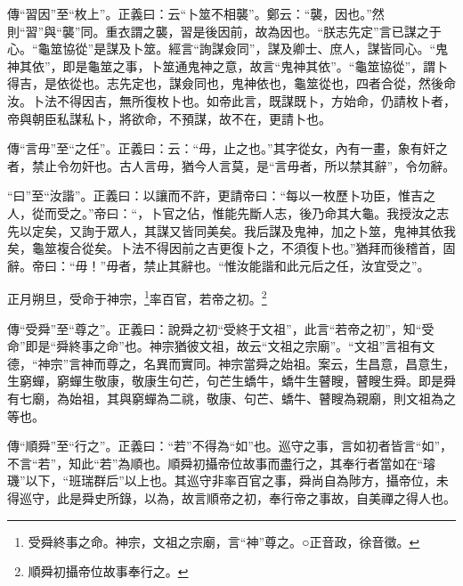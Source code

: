 {\noindent\zhuan{}\fzbyks 傳“習因”至“枚上”。正義曰：云“卜筮不相襲”。鄭云：“襲，因也。”然則“習”與“襲”同。重衣謂之襲，習是後因前，故為因也。“朕志先定”言已謀之于心。“龜筮協從”是謀及卜筮。經言“詢謀僉同”，謀及卿士、庶人，謀皆同心。“鬼神其依”，即是龜筮之事，卜筮通鬼神之意，故言“鬼神其依”。“龜筮協從”，謂卜得吉，是依從也。志先定也，謀僉同也，鬼神依也，龜筮從也，四者合從，然後命汝。卜法不得因吉，無所復枚卜也。如帝此言，既謀既卜，方始命，仍請枚卜者，帝與朝臣私謀私卜，將欲命，不預謀，故不在，更請卜也。 \par}

{\noindent\zhuan{}\fzbyks 傳“言毋”至“之任”。正義曰：云：“毋，止之也。”其字從女，內有一畫，象有奸之者，禁止令勿奸也。古人言毋，猶今人言莫，是“言毋者，所以禁其辭”，令勿辭。 \par}

{\noindent\shu{}\fzkt “曰”至“汝諧”。正義曰：以讓而不許，更請帝曰：“每以一枚歷卜功臣，惟吉之人，從而受之。”帝曰：“，卜官之佔，惟能先斷人志，後乃命其大龜。我授汝之志先以定矣，又詢于眾人，其謀又皆同美矣。我后謀及鬼神，加之卜筮，鬼神其依我矣，龜筮複合從矣。卜法不得因前之吉更復卜之，不須復卜也。”猶拜而後稽首，固辭。帝曰：“毋！”毋者，禁止其辭也。“惟汝能諧和此元后之任，汝宜受之”。 \par}


正月朔旦，受命于神宗，\footnote{受舜終事之命。神宗，文祖之宗廟，言“神”尊之。○正音政，徐音徵。}率百官，若帝之初。\footnote{順舜初攝帝位故事奉行之。}

{\noindent\zhuan{}\fzbyks 傳“受舜”至“尊之”。正義曰：說舜之初“受終于文祖”，此言“若帝之初”，知“受命”即是“舜終事之命”也。神宗猶彼文祖，故云“文祖之宗廟”。“文祖”言祖有文德，“神宗”言神而尊之，名異而實同。神宗當舜之始祖。案云，生昌意，昌意生，生窮蟬，窮蟬生敬康，敬康生句芒，句芒生蟜牛，蟜牛生瞽瞍，瞽瞍生舜。即是舜有七廟，為始祖，其與窮蟬為二祧，敬康、句芒、蟜牛、瞽瞍為親廟，則文祖為之等也。 \par}

{\noindent\zhuan{}\fzbyks 傳“順舜”至“行之”。正義曰：“若”不得為“如”也。巡守之事，言如初者皆言“如”，不言“若”，知此“若”為順也。順舜初攝帝位故事而盡行之，其奉行者當如在“璿璣”以下，“班瑞群后”以上也。其巡守非率百官之事，舜尚自為陟方，攝帝位，未得巡守，此是舜史所錄，以為，故言順帝之初，奉行帝之事故，自美禪之得人也。 \par}

